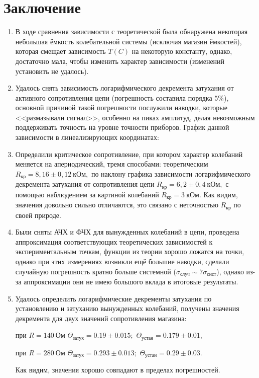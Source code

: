 \documentclass[
a4paper, %
12pt, %
]{article}
\begin{document}
	\newpage
	
	\section{Заключение}
	\begin{enumerate}
		\item В ходе сравнения зависимости с теоретической была обнаружена некоторая небольшая ёмкость колебательной системы (исключая магазин ёмкостей), которая смещает зависимость $T(C)$ на некоторую константу, однако, достаточно мала, чтобы изменить характер зависимости (изменений установить не удалось).
		
		\item Удалось снять зависимость логарифмического декремента затухания от активного сопротивления цепи (погрешность составила порядка $5\%$), основной причиной такой погрешности послужили наводки, которые <<размазывали сигнал>>, особенно на пиках амплитуд, делая невозможным поддерживать точность на уровне точности приборов. График данной зависимости в линеализирующих координатах:
		
		\item Определили критическое сопротивление, при котором характер колебаний меняется на апериодический, тремя способами: теоретическим $R_\text{кр} = 8,16 \pm 0,12 \ \text{кОм},$ по наклону графика зависимости логарифмического декремента затухания от сопротивления цепи $R_\text{кр} = 6,2 \pm 0,4 \ \text{кОм},$ с помощью наблюдением за картиной колебаний $R_\text{кр} = 3 \ \text{кОм}.$ Как видим, значения довольно сильно отличаются, это связано с неточностью $R_\text{кр}$ по своей природе.
		
		\item Были сняты АЧХ и ФЧХ для вынужденных колебаний в цепи, проведена аппроксимация соответствующих теоретических зависимостей к экспериментальным точкам, функции из теории хорошо ложатся на точки, однако при этих измерениях возникли ещё большие наводки, сделали случайную погрешность кратно больше системной ($\sigma_\text{случ} \sim 7 \sigma_\text{сист}$), однако из-за аппроксимации они не имею большого вклада в итоговые результаты.
		
		\item Удалось определить логарифмические декременты затухания по установлению и затуханию вынужденных колебаний, получены значения декремента для двух значений сопротивления магазина:
		
		при $R = 140 \ \text{Ом}$ $\Theta_\text{затух} = 0.19 \pm 0.015;$ $\Theta_\text{устан} = 0.179 \pm 0.01$, 
		
		при $R = 280 \ \text{Ом}$ $\Theta_\text{затух} = 0.293 \pm 0.013;$ $\Theta_\text{устан} = 0.29 \pm 0.03$. 
		
		Как видим, значения хорошо совпадают в пределах погрешностей. 
		
	\end{enumerate}
	
	
\end{document}
